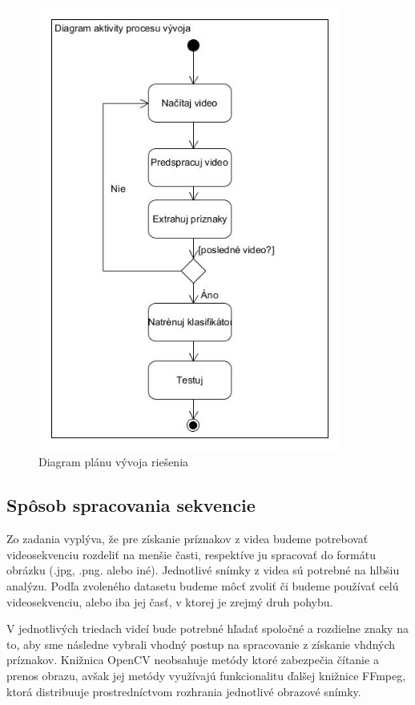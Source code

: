 \begin{figure}[H]
  \centering
  \includegraphics[width=10cm]{img/actTrenovanieKlasifikatora.jpg}
  \caption{Diagram plánu vývoja riešenia}
  \label{UML1}
\end{figure}

\subsection{Spôsob spracovania sekvencie}
Zo zadania vyplýva, že pre získanie príznakov z videa budeme potrebovať videosekvenciu rozdeliť na menšie časti, respektíve ju spracovať do formátu obrázku (.jpg, .png. alebo iné). Jednotlivé snímky z videa sú potrebné na hlbšiu analýzu. Podľa zvoleného datasetu budeme môcť zvoliť či budeme používať celú videosekvenciu, alebo iba jej časť, v ktorej je zrejmý druh pohybu. 

V jednotlivých triedach videí bude potrebné hľadať spoločné a rozdielne znaky na to, aby sme následne vybrali vhodný postup na spracovanie z získanie vhdných príznakov. Knižnica OpenCV neobsahuje metódy ktoré zabezpečia čítanie a prenos obrazu, avšak jej metódy využívajú funkcionalitu ďalšej knižnice FFmpeg, ktorá distribuuje prostredníctvom rozhrania jednotlivé obrazové snímky. 

